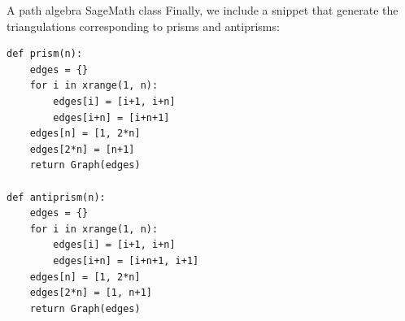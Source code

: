 \begin{chapter}{A path algebra SageMath class}
Finally, we include a snippet that generate the triangulations corresponding to prisms and antiprisms:

\begin{lstlisting}
def prism(n):
    edges = {}
    for i in xrange(1, n):
        edges[i] = [i+1, i+n]
        edges[i+n] = [i+n+1]
    edges[n] = [1, 2*n]
    edges[2*n] = [n+1]
    return Graph(edges)

def antiprism(n):
    edges = {}
    for i in xrange(1, n):
        edges[i] = [i+1, i+n]
        edges[i+n] = [i+n+1, i+1]
    edges[n] = [1, 2*n]
    edges[2*n] = [1, n+1]
    return Graph(edges)
\end{lstlisting}
\end{chapter}